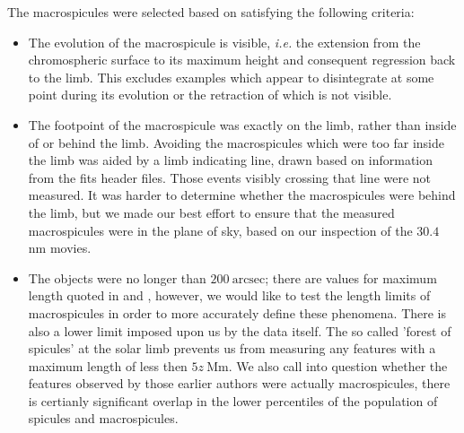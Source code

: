 The macrospicules were selected based on satisfying the following criteria: 
\begin{itemize}
	\item{ The evolution of the macrospicule is visible, \emph{i.e.} the extension from the chromospheric surface to its maximum height and consequent regression back to the limb. This excludes examples which appear to disintegrate at some point during its evolution or the retraction of which is not visible.}
	\item{The footpoint of the macrospicule was exactly on the limb, rather than inside of or behind the limb. Avoiding the macrospicules which were too far inside the limb was aided by a limb indicating line, drawn based on information from the fits header files. Those events visibly crossing that line were not measured. It was harder to determine whether the macrospicules were behind the limb, but we made our best effort to ensure that the measured macrospicules were in the plane of sky, based on our inspection of the $30.4$ nm movies.}
	\item{The objects were no longer than $200\ \textrm{arcsec}$; there are values for maximum length quoted in \cite{Bohlin1975} and \cite{Dere89}, however, we would like to test the length limits of macrospicules in order to more accurately define these phenomena. There is also a lower limit imposed upon us by the data itself. The so called 'forest of spicules' at the solar limb prevents us from measuring any features with a maximum length of less then $5z\ \textrm{Mm}$. We also call into question whether the features observed by those earlier authors were actually macrospicules, there is certianly significant overlap in the lower percentiles of the population of spicules and macrospicules.}
\end{itemize}


